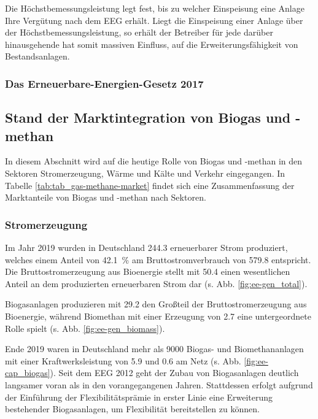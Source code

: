 Die Höchstbemessungsleistung legt fest, bis zu welcher Einspeisung eine Anlage Ihre Vergütung nach dem \gls{EEG} erhält. Liegt die Einspeisung einer Anlage über der Höchstbemessungsleistung, so erhält der Betreiber für jede darüber hinausgehende \si{\kwh} hat somit massiven Einfluss, auf die Erweiterungsfähigkeit von Bestandsanlagen.

\subsubsection{Das Erneuerbare-Energien-Gesetz 2017}




\subsection{Stand der Marktintegration von Biogas und -methan}

In diesem Abschnitt wird auf die heutige Rolle von Biogas und -methan in den Sektoren Stromerzeugung, Wärme und Kälte und Verkehr eingegangen. In Tabelle \ref{tab:tab_gas-methane-market} findet sich eine Zusammenfassung der Marktanteile von Biogas und -methan nach Sektoren.



\subsubsection{Stromerzeugung}

Im Jahr 2019 wurden in Deutschland \SI{244.3}{\twh} erneuerbarer Strom produziert, welches einem Anteil von \SI{42.1}{\percent} am Bruttostromverbrauch von \SI{579.8}{\twh} entspricht. Die Bruttostromerzeugung aus Bioenergie stellt mit \SI{50.4}{\twh} einen wesentlichen Anteil an dem produzierten erneuerbaren Strom dar (s. Abb. \ref{fig:ee-gen_total}). \parencite{BWE2020} 



Biogasanlagen produzieren mit \SI{29.2}{\twh} den Großteil der Bruttostromerzeugung aus Bioenergie, während Biomethan mit einer Erzeugung von \SI{2.7}{\twh} eine untergeordnete Rolle spielt (s. Abb. \ref{fig:ee-gen_biomass}). \parencite{BWE2020} 



Ende 2019 waren in Deutschland mehr als \SI{9000}{\relax} Biogas- und Biomethananlagen mit einer Kraftwerksleistung von \SI{5.9}{\gw} und \SI{0.6}{\gw} am Netz (s. Abb. \ref{fig:ee-cap_biogas}). Seit dem \gls{EEG} 2012 geht der Zubau von Biogasanlagen deutlich langsamer voran als in den vorangegangenen Jahren. Stattdessen erfolgt aufgrund der Einführung der Flexibilitätsprämie in erster Linie eine Erweiterung bestehender Biogasanlagen, um Flexibilität bereitstellen zu können. \parencite{BWE2020} \parencite{DanielGromke2019}

